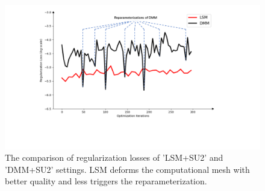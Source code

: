 \begin{figure}[!htb]
    \begin{center}
        \includegraphics[width=0.9\linewidth]{chapter4/fig/lsm_dmm_avm_loss_compare.pdf}
    \end{center}
    \caption{
        \small The comparison of regularization losses of 'LSM+SU2' and 'DMM+SU2' settings. LSM deforms the computational mesh with better quality and less triggers the reparameterization.
    }
    \label{ch4:fig:reg_loss_compare}
\end{figure}